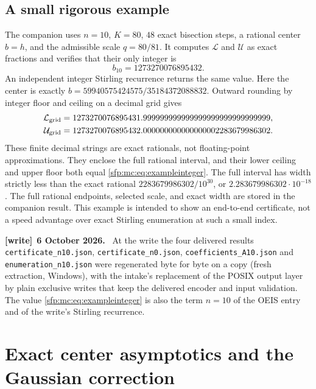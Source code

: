 \documentclass[11pt,letterpaper]{article}
\numberwithin{equation}{section}
\theoremstyle{definition}\newtheorem{definition}[theorem]{Definition}
\theoremstyle{remark}\newtheorem{remark}[theorem]{Remark}
\newcommand{\file}[1]{\nolinkurl{#1}}
\newenvironment{writenote}[1][]{\par\smallskip\begingroup\small
 \noindent\textbf{[write]}\if\relax\detokenize{#1}\relax\else~\textbf{#1.}\fi\ }%
 {\par\endgroup\smallskip}
\begin{document}
\subsection{A small rigorous example}
The companion uses $n=10$, $K=80$, $48$ exact bisection steps,
a rational center $b=h$, and the admissible scale $q=80/81$.
It computes $\mathcal L$ and $\mathcal U$ as exact fractions and
verifies that their only integer is
\begin{equation}\label{sfp:mc:eq:exampleinteger}
 b_{10}=1273270076895432.
\end{equation}
An independent integer Stirling recurrence returns the same value.
Here the center is exactly $b=59940575424575/35184372088832$.
Outward rounding by integer floor and ceiling on a decimal grid gives
\begin{align*}
 \mathcal L_{\rm grid}&=1273270076895431.999999999999999999999999999999,\\
 \mathcal U_{\rm grid}&=1273270076895432.000000000000000002283679986302.
\end{align*}
These finite decimal strings are exact rationals, not floating-point
approximations. They enclose the full rational interval, and their
lower ceiling and upper floor both equal \eqref{sfp:mc:eq:exampleinteger}.
The full interval has width strictly less than the exact rational
$2283679986302/10^{30}$, or $2.283679986302\cdot10^{-18}$.
The full rational endpoints, selected scale, and exact width are
stored in the companion result. This example is intended to show an
end-to-end certificate, not a speed advantage over exact Stirling
enumeration at such a small index.
\begin{writenote}[6 October 2026]
At the write the four delivered results \file{certificate_n10.json}, \file{certificate_n0.json}, \file{coefficients_A10.json} and \file{enumeration_n10.json} were regenerated byte for byte on a copy (fresh extraction, Windows), with the intake's replacement of the POSIX output layer by plain exclusive writes that keep the delivered encoder and input validation. The value \eqref{sfp:mc:eq:exampleinteger} is also the term $n=10$ of the OEIS entry and of the write's Stirling recurrence.
\end{writenote}

\section{Exact center asymptotics and the Gaussian correction}
\label{sfp:mc:sec:moment}
\end{document}
